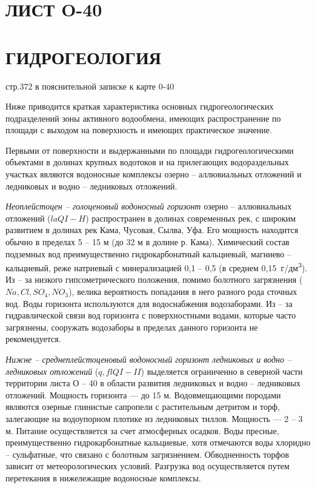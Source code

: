 


\section*{ЛИСТ O-40}
\section*{ГИДРОГЕОЛОГИЯ}
стр.372 в пояснительной записке к карте 0-40

Ниже приводится краткая характеристика основных гидрогеологических
подразделений зоны активного водообмена, имеющих распространение по
площади с выходом на поверхность и имеющих практическое значение.

Первыми от поверхности и выдержанными по площади гидрогеологическими объектами в долинах крупных водотоков и на прилегающих водораздельных участках являются водоносные комплексы озерно -- аллювиальных
отложений и ледниковых и водно -- ледниковых отложений.

\textit{Неоплейстоцен -- голоценовый водоносный горизонт} озерно -- аллювиальных отложений ($laQI - H$) распространен в долинах современных рек, с широким развитием в долинах рек Кама, Чусовая, Сылва, Уфа. Его мощность находится обычно в пределах 5 -- 15 м (до 32 м в долине р. Кама). Химический
состав подземных вод преимущественно гидрокарбонатный кальциевый, магниево -- кальциевый, реже натриевый с минерализацией 0,1 -- 0,5 (в среднем
0,15~г/дм\textsuperscript{3}). Из -- за низкого гипсометрического положения, помимо болотного загрязнения ($Na, Cl, SO_4, NO_3$), велика вероятность попадания в него
разного рода сточных вод. Воды горизонта используются для водоснабжения водозаборами. Из -- за гидравлической связи вод горизонта с поверхностными
водами, которые часто загрязнены, сооружать водозаборы в пределах данного горизонта не рекомендуется.

\textit{Нижне -- среднеплейстоценовый водоносный горизонт ледниковых и водно -- ледниковых отложений} ($q,flQI - II$) выделяется ограниченно в северной
части территории листа О -- 40 в области развития ледниковых и водно -- ледниковых отложений. Мощность горизонта --- до 15 м. 
Водовмещающими породами являются озерные глинистые сапропели с растительным детритом и торф, залегающие на водоупорном плотике из ледниковых тиллов. Мощность --- 2 -- 3 м. Питание осуществляется за счет атмосферных осадков. Воды пресные, преимущественно гидрокарбонатные кальциевые, хотя отмечаются воды хлоридно -- сульфатные, что связано с болотным загрязнением. Обводненность торфов зависит от метеорологических условий. Разгрузка вод осуществляется путем перетекания в нижележащие водоносные комплексы.

